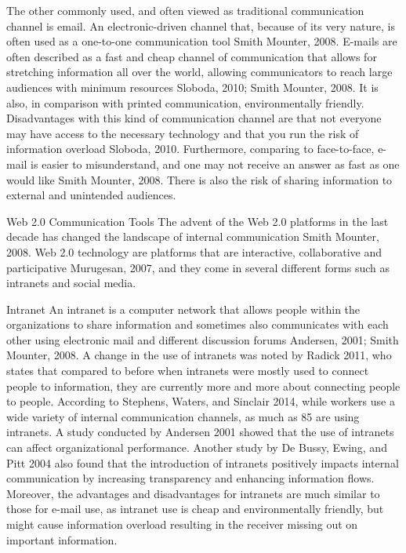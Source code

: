 The other commonly used, and often viewed as traditional communication channel is email. An electronic-driven channel that, because of its very nature, is often used as a one-to-one communication tool Smith  Mounter, 2008. E-mails are often described as a fast and cheap channel of communication that allows for stretching information all over the world, allowing communicators to reach large audiences with minimum resources Sloboda, 2010; Smith  Mounter, 2008. It is also, in comparison with printed communication, environmentally friendly. Disadvantages with this kind of communication channel are that not everyone may have access to the necessary technology and that you run the risk of information overload Sloboda, 2010. Furthermore, comparing to face-to-face, e-mail is easier to misunderstand, and one may not receive an answer as fast as one would like Smith  Mounter, 2008. There is also the risk of sharing information to external and unintended audiences.

Web 2.0 Communication Tools
The advent of the Web 2.0 platforms in the last decade has changed the landscape of internal communication Smith  Mounter, 2008. Web 2.0 technology are platforms that are interactive, collaborative and participative Murugesan, 2007, and they come in several different forms such as intranets and social media. 


Intranet
An intranet is a computer network that allows people within the organizations to share information and sometimes also communicates with each other using electronic mail and different discussion forums Andersen, 2001; Smith  Mounter, 2008. A change in the use of intranets was noted by Radick 2011, who states that compared to before when intranets were mostly used to connect people to information, they are currently more and more about connecting people to people. According to Stephens, Waters, and Sinclair 2014, while workers use a wide variety of internal communication channels, as much as 85 are using intranets. 
A study conducted by Andersen 2001 showed that the use of intranets can affect organizational performance. Another study by De Bussy, Ewing, and Pitt 2004 also found that the introduction of intranets positively impacts internal communication by increasing transparency and enhancing information flows. Moreover, the advantages and disadvantages for intranets are much similar to those for e-mail use, as intranet use is cheap and environmentally friendly, but might cause information overload resulting in the receiver missing out on important information.

